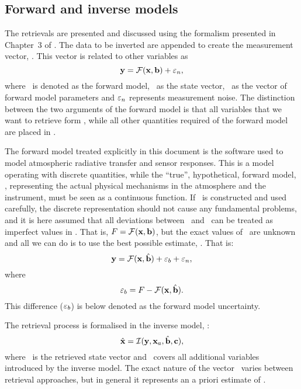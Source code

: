 \subsection{Forward and inverse models}
%
The retrievals are presented and discussed using the formalism presented in
Chapter~3 of \citet{rodgers:00}. The data to be inverted are appended to create
the measurement vector, \MsrVct. This vector is related to other variables as
\begin{equation}
  \label{eq:fmodel1}
  \mathbf{y} = \mathcal{F}(\mathbf{x},\mathbf{b}) + \varepsilon_n,
\end{equation}
where \FrwMdl\ is denoted as the forward model, \SttVct\ as the state vector,
\FrwMdlVct\ as the vector of forward model parameters and $\varepsilon_n$
represents measurement noise. The distinction between the two arguments of the
forward model is that all variables that we want to retrieve form \SttVct,
while all other quantities required of the forward model are placed in
\FrwMdlVct. 

The forward model treated explicitly in this document is the software used to
model atmospheric radiative transfer and sensor responses. This is a model
operating with discrete quantities, while the ``true'', hypothetical, forward
model, \trueFrwMdl, representing the actual physical mechanisms in the atmosphere
and the instrument, must be seen as a continuous function. If \FrwMdl\ is
constructed and used carefully, the discrete representation should not cause
any fundamental problems, and it is here assumed that all deviations between
\trueFrwMdl\ and \FrwMdl\ can be treated as imperfect values in \FrwMdlVct.
That is, $F=\mathcal{F}(\mathbf{x},\mathbf{b})$, but the exact values of
\FrwMdlVct\ are unknown and all we can do is to use the best possible estimate,
\FrwMdlVctHat. That is:
\begin{equation}
  \label{eq:fmodel2}
  \mathbf{y} = \mathcal{F}(\mathbf{x},\hat{\mathbf{b}}) + \varepsilon_b + \varepsilon_n,
\end{equation}
where 
\begin{equation}
  \label{eq:eps_b}
  \varepsilon_b = F - \mathcal{F}(\mathbf{x},\hat{\mathbf{b}}).
\end{equation}
This difference ($\varepsilon_b$) is below denoted as the forward model
uncertainty. 

The retrieval process is formalised in the inverse model, \InvMdl:
\begin{equation}
  \label{eq:imodel}
   \hat{\mathbf{x}} = \mathcal{I}(\mathbf{y},\mathbf{x}_{a},\hat{\mathbf{b}},\mathbf{c}),
\end{equation}
where \RtrVct\ is the retrieved state vector and \InvMdlVct\ covers all
additional variables introduced by the inverse model. The exact nature
of the vector \ varies between retrieval approaches, but in general it 
represents an a priori estimate of \SttVct.


